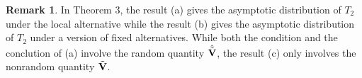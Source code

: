 \documentclass[3p]{elsarticle}
\theoremstyle{plain}
\theoremstyle{definition}
\newtheorem{remark}{\quad\quad Remark}
\theoremstyle{remark}
\begin{document}
\begin{remark}
    In Theorem 3, the result (a) gives the asymptotic distribution of $T_2$ under the local alternative while the result (b) gives the asymptotic distribution of $T_2$ under a version of fixed alternatives.
    While both the condition and the conclution of (a) involve the random quantity $\hat{\tilde{\mathbf{V}}}$, the result (c) only involves the nonrandom quantity $\tilde{\mathbf{V}}$.
\end{remark}

\end{document}
